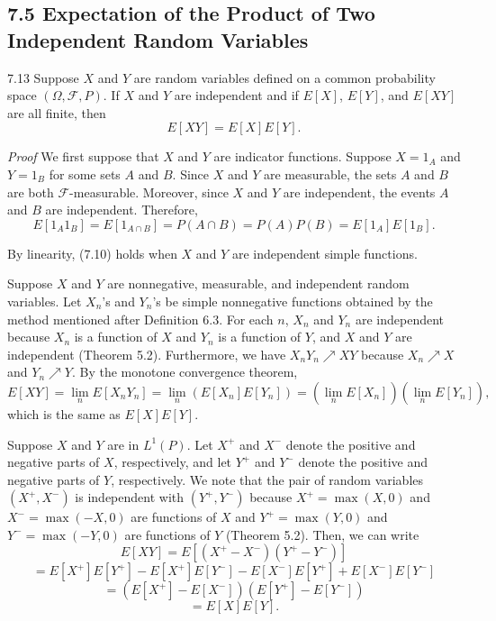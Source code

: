 \subsection*{7.5 Expectation of the Product of Two Independent Random Variables}

\begin{thmbox}{7.13}
Suppose $X$ and $Y$ are random variables defined on a common probability space $(\Omega,\mathcal{F},P)$. If $X$ and $Y$ are independent and if $E[X]$, $E[Y]$, and $E[XY]$ are all finite, then
\begin{equation}
E[XY]=E[X]E[Y].
\tag{7.10}
\end{equation}
\end{thmbox}

\textit{Proof} We first suppose that $X$ and $Y$ are indicator functions. Suppose $X=1_A$ and $Y=1_B$ for some sets $A$ and $B$. Since $X$ and $Y$ are measurable, the sets $A$ and $B$ are both $\mathcal{F}$-measurable. Moreover, since $X$ and $Y$ are independent, the events $A$ and $B$ are independent. Therefore,
\[
E[1_A1_B] = E[1_{A\cap B}] = P(A\cap B) = P(A)P(B) = E[1_A]E[1_B].
\]

By linearity, (7.10) holds when $X$ and $Y$ are independent simple functions.

Suppose $X$ and $Y$ are nonnegative, measurable, and independent random variables. Let $X_n$'s and $Y_n$'s be simple nonnegative functions obtained by the method mentioned after Definition 6.3. For each $n$, $X_n$ and $Y_n$ are independent because $X_n$ is a function of $X$ and $Y_n$ is a function of $Y$, and $X$ and $Y$ are independent (Theorem 5.2). Furthermore, we have $X_nY_n \nearrow XY$ because $X_n \nearrow X$ and $Y_n \nearrow Y$. By the monotone convergence theorem,
\[
E[XY]
=
\lim_n E[X_nY_n]
=
\lim_n (E[X_n]E[Y_n])
=
(\lim_n E[X_n])(\lim_n E[Y_n]),
\]
which is the same as $E[X]E[Y]$.

Suppose $X$ and $Y$ are in $L^1(P)$. Let $X^+$ and $X^-$ denote the positive and negative parts of $X$, respectively, and let $Y^+$ and $Y^-$ denote the positive and negative parts of $Y$, respectively. We note that the pair of random variables $(X^+,X^-)$ is independent with $(Y^+,Y^-)$ because $X^+=\max(X,0)$ and $X^-=\max(-X,0)$ are functions of $X$ and $Y^+=\max(Y,0)$ and $Y^-=\max(-Y,0)$ are functions of $Y$ (Theorem 5.2). Then, we can write
\[
E[XY]=E[(X^+-X^-)(Y^+-Y^-)]
\]
\[
= E[X^+]E[Y^+] - E[X^+]E[Y^-] - E[X^-]E[Y^+] + E[X^-]E[Y^-]
\]
\[
= (E[X^+]-E[X^-])(E[Y^+]-E[Y^-])
\]
\[
= E[X]E[Y].
\]

